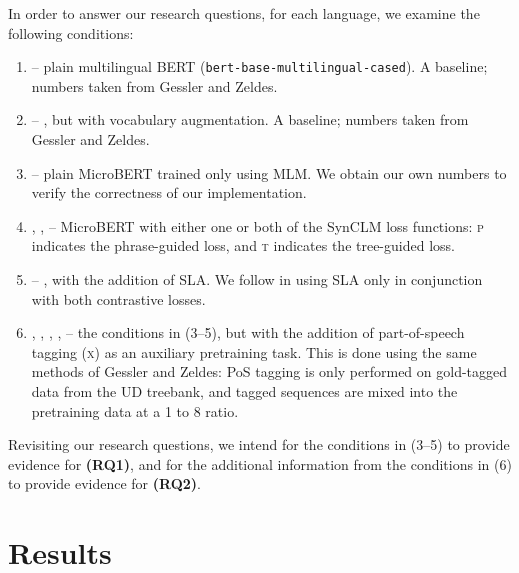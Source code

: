 \documentclass[11pt]{article}
\begin{document}
In order to answer our research questions, for each language, we examine the following conditions:
\begin{enumerate}
\setlength\itemsep{0em}
    \item \mbert{} -- plain multilingual BERT (\texttt{\small bert-base-multilingual-cased}). A baseline; numbers taken from Gessler and Zeldes.
    \item \mbertva{} -- \mbert{}, but with vocabulary augmentation. A baseline; numbers taken from Gessler and Zeldes.
    \item \m{} -- plain MicroBERT trained only using MLM. We obtain our own numbers to verify the correctness of our implementation.
    \item \mp, \mt, \mpt{} -- MicroBERT with either one or both of the SynCLM loss functions: \textsc{p} indicates the phrase-guided loss, and \textsc{t} indicates the tree-guided loss.%
    \item \mptsla{} -- \mpt{}, with the addition of SLA. We follow \citet{zhang-2022-improve} in using SLA only in conjunction with both contrastive losses.
    \item \mx, \mxp, \mxt, \mxpt, \mxptsla -- the conditions in (3--5), but with the addition of part-of-speech tagging (\textsc{x}) as an auxiliary pretraining task. This is done using the same methods of Gessler and Zeldes: PoS tagging is only performed on gold-tagged data from the UD treebank, and tagged sequences are mixed into the pretraining data at a 1 to 8 ratio.
\end{enumerate}

Revisiting our research questions, we intend for the conditions in (3--5) to provide evidence for \textbf{(RQ1)}, and for the additional information from the conditions in (6) to provide evidence for \textbf{(RQ2)}.

\section{Results}
\end{document}
